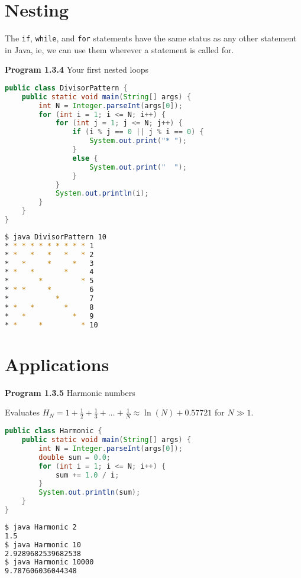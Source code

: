 \documentclass[8pt,a4paper,compress]{beamer}
\begin{document}
\section{Nesting}
\begin{frame}[fragile]
\pause

The \lstinline$if$, \lstinline$while$, and \lstinline$for$ statements have the same status as any other statement in Java, ie, we can use them wherever a statement is called for.

\pause
\smallskip

\textbf{Program 1.3.4} Your first nested loops

\begin{lstlisting}[language=Java]
public class DivisorPattern {
    public static void main(String[] args) { 
        int N = Integer.parseInt(args[0]);
        for (int i = 1; i <= N; i++) {
            for (int j = 1; j <= N; j++) {
                if (i % j == 0 || j % i == 0) {
                    System.out.print("* "); 
                }
                else { 
                    System.out.print("  ");
                } 
            }
            System.out.println(i);
        }
    }
}
\end{lstlisting}

\pause

\begin{lstlisting}[language=bash]
$ java DivisorPattern 10
* * * * * * * * * * 1
* *   *   *   *   * 2
*   *     *     *   3
* *   *       *     4
*       *         * 5
* * *     *         6
*           *       7
* *   *       *     8
*   *           *   9
* *     *         * 10
\end{lstlisting}
\end{frame}

\section{Applications}

\begin{frame}[fragile]
\pause

\textbf{Program 1.3.5} Harmonic numbers

\begin{framed}
\tiny Evaluates $H_N=1+\frac{1}{2}+\frac{1}{3}+\dots+\frac{1}{N}\approx\ln(N)+0.57721$ for $N\gg 1$.
\end{framed}

\begin{lstlisting}[language=Java]
public class Harmonic { 
    public static void main(String[] args) { 
        int N = Integer.parseInt(args[0]);
        double sum = 0.0;
        for (int i = 1; i <= N; i++) {
            sum += 1.0 / i;
        }
        System.out.println(sum);
    }
}
\end{lstlisting}

\pause

\begin{lstlisting}[language=bash]
$ java Harmonic 2
1.5
$ java Harmonic 10
2.9289682539682538
$ java Harmonic 10000
9.787606036044348
\end{lstlisting}
\end{frame}
\end{document}
